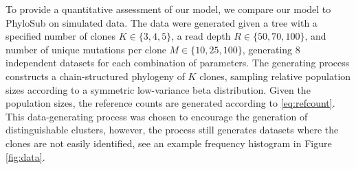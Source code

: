 \documentclass{bioinfo}
\begin{document}
To provide a quantitative assessment of our model, we compare our model to PhyloSub on simulated data.  The data were generated given a tree with a specified number of clones $K \in \{3,4,5\}$, a read depth $R \in \{50,70,100\}$, and number of unique mutations per clone $M \in \{10,25,100\}$, generating 8 independent datasets for each combination of parameters.  The generating process constructs a chain-structured phylogeny of $K$ clones, sampling relative population sizes according to a symmetric low-variance beta distribution.  Given the population sizes, the reference counts are generated according to \eqref{eq:refcount}.  This data-generating process was chosen to encourage the generation of distinguishable clusters, however, the process still generates datasets where the clones are not easily identified, see an example frequency histogram in Figure \ref{fig:data}. 
\end{document}
